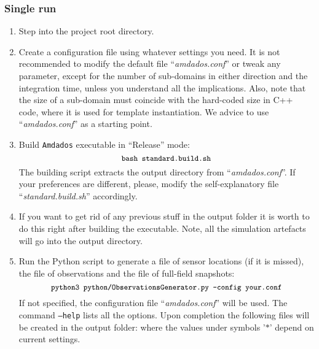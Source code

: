 \documentclass[]{article}
\begin{document}
\subsubsection{Single run}
\begin{enumerate}
\item Step into the project root directory.
\item Create a configuration file using whatever settings you need. It is not recommended to modify the default file ``\textit{amdados.conf}'' or tweak any parameter, except for the number of sub-domains in either direction and the integration time, unless you understand all the implications. Also, note that the size of a sub-domain must coincide with the hard-coded size in C++ code, where it is used for template instantiation. We advice to use ``\textit{amdados.conf}'' as a starting point.
\item Build \texttt{Amdados} executable in ``Release'' mode:
$$
\mbox{\small\texttt{bash standard.build.sh}}
$$
The building script extracts the output directory from ``\textit{amdados.conf}''. If your preferences are different, please, modify the self-explanatory file ``\textit{standard.build.sh}'' accordingly.
\item If you want to get rid of any previous stuff in the output folder it is worth to do this right after building the executable. Note, all the simulation artefacts will go into the output directory. 
\item Run the Python script to generate a file of sensor locations (if it is missed), the file of observations and the file of full-field snapshots:
$$
\mbox{\small\texttt{python3 python/ObservationsGenerator.py --config your.conf}}
$$
If not specified, the configuration file ``\textit{amdados.conf}'' will be used. The command \texttt{--help} lists all the options. Upon completion the following files will be created in the output folder: \newline
{} \newline
{} \newline
{} \newline
where the values under symbols '$*$' depend on current settings.
\end{enumerate}
\end{document}
